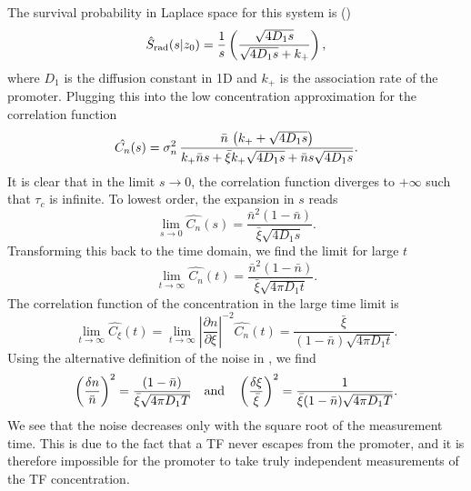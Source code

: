The survival probability in Laplace space for this system is ()
\begin{equation}
 \hat{S}_{\rm rad}(s|z_0) = \frac{1}{s}\left( \frac{\sqrt{4 D_1 s}}{\sqrt{4 D_1 s} + k_+} \right),
 \elabel{LSx0}
\end{equation}
where $D_1$ is the diffusion constant in 1D and $k_+$ is the association rate of the promoter. Plugging this into the low concentration approximation for the correlation function 
\begin{equation}
  \hat{C_n}(s) = \sigma_n^2 \, \frac{\bar{n} \, \left( k_+ + \sqrt{4 D_1 s} \right)}{k_+ \bar{n} s + \bar{\xi} k_+ \sqrt{4 D_1 s} + \bar{n} s \sqrt{4 D_1 s}}.
  \elabel{LapCorr1D}
\end{equation}
It is clear that in the limit $s \to 0$, the correlation function diverges to $+\infty$ such that $\tau_c$ is infinite. To lowest order, the expansion in $s$ reads
\begin{equation}
 \lim_{s \to 0} \hat{C_n}(s) = \frac{\bar{n}^2(1-\bar{n})}{\bar{\xi} \sqrt{4 D_1 s}}.
\end{equation}
Transforming this back to the time domain, we find the limit for large $t$
\begin{equation}
 \lim_{t \to \infty} \hat{C_n}(t) = \frac{\bar{n}^2(1-\bar{n})}{\bar{\xi} \sqrt{4 \pi D_1 t}}.
\end{equation}
The correlation function of the concentration in the large time limit is
\begin{equation}
 \lim_{t \to \infty} \hat{C_{\xi}}(t) = \lim_{t \to \infty} \left| \frac{\partial n}{\partial \xi} \right|^{-2} \hat{C_n}(t) = \frac{\bar{\xi}}{(1 - \bar{n}) \sqrt{4 \pi D_1 t}}.
\end{equation}
Using the alternative definition of the noise in , we find
\begin{equation}
 \left( \frac{\delta n}{\bar{n}} \right)^2 =  \frac{(1-\bar{n})}{\bar{\xi} \sqrt{4 \pi D_1 T}} \quad \text{and} \quad \left( \frac{\delta \xi}{\bar{\xi}} \right)^2 = \frac{1}{ \bar{\xi} (1 - \bar{n}) \sqrt{4 \pi D_1 T}}. 
 \elabel{Noise1D}
\end{equation}
We see that the noise decreases only with the square root of the measurement time. This is due to the fact that a TF never escapes from the promoter, and it is therefore impossible for the promoter to take truly independent measurements of the TF concentration. 


